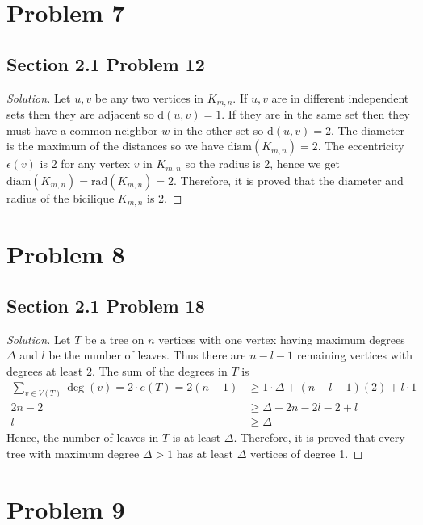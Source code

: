 \documentclass[12pt]{article}
\newenvironment*{solution}{\begin{proof}[Solution]}{\end{proof}}
\begin{document}
\section*{Problem 7}
\subsection*{Section 2.1 Problem 12}
\begin{solution}
    Let \(u,v\) be any two vertices in \(K_{m,n}\). If \(u,v\) are in
    different independent sets then they are adjacent so \(\text{d}(u,v)=1\).
    If they are in the same set then they must have a common neighbor \(w\) in
    the other set so \(\text{d}(u,v)=2\). The diameter is the maximum of the
    distances so we have \(\text{diam}(K_{m,n})=2\). The eccentricity \(
    \epsilon(v)\) is 2 for any vertex \(v\) in \(K_{m,n}\) so the radius is 2,
    hence we get \(\text{diam}(K_{m,n})=\text{rad}(K_{m,n})=2\). Therefore, it
    is proved that the diameter and radius of the bicilique \(K_{m,n}\) is 2.
\end{solution}
\section*{Problem 8}
\subsection*{Section 2.1 Problem 18}
\begin{solution}
    Let \(T\) be a tree on \(n\) vertices with one vertex having maximum
    degrees \(\Delta\) and \(l\) be the number of leaves. Thus there are \(n-l
    -1\) remaining vertices with degrees at least 2. The sum of the degrees in
    \(T\) is
    \begin{align*}
        \sum_{v\in V(T)}\deg(v)=2\cdot e(T)=2(n-1)&\geq 1\cdot\Delta+(
            n-l-1)(2)+l\cdot1\\2n-2&\geq \Delta+2n-2l-2+l\\l&\geq \Delta
    \end{align*}
    Hence, the number of leaves in \(T\) is at least \(\Delta\). Therefore, it
    is proved that every tree with maximum degree \(\Delta>1\) has at least \(
    \Delta\) vertices of degree 1.
\end{solution}
\section*{Problem 9}
\end{document}
